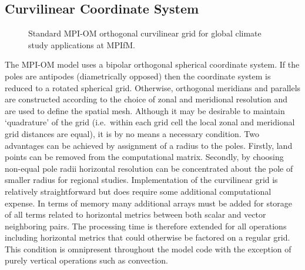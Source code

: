 \subsection{Curvilinear Coordinate System}
\label{ch:numeric:curvilinear}


\begin{figure}[!tb]%
\centerline{\hbox{}}
\caption{Standard \mbox{MPI-OM} orthogonal curvilinear grid for global climate study applications at MPIfM.}
\label{fig:numeric:antagrid}
\end{figure}

The \mbox{MPI-OM} model uses a bipolar orthogonal spherical coordinate system.
If the poles are antipodes (diametrically opposed) then the coordinate system
is reduced to a rotated spherical grid.
Otherwise, orthogonal meridians and parallels are constructed
according to the choice of zonal and meridional resolution and are used to define the spatial mesh.
Although it may be desirable to maintain `quadrature' of the grid
(i.e.\ within each grid cell the local zonal and meridional grid distances are equal),
it is by no means a necessary condition.
Two advantages can be achieved by assignment of a radius to the poles.
Firstly, land points can be removed from the computational matrix.
Secondly, by choosing non-equal pole radii horizontal resolution can be
concentrated about the pole of smaller radius for regional studies.
Implementation of the curvilinear grid is relatively straightforward
but does require 
some additional computational expense.
In terms of memory many additional arrays must be added for storage of all terms
related to horizontal metrics between both scalar and vector neighboring pairs.
The processing time is therefore extended for all operations including horizontal metrics
that could otherwise be factored on a regular grid.
This condition is omnipresent throughout the model code with the exception of purely vertical
operations such as convection.

